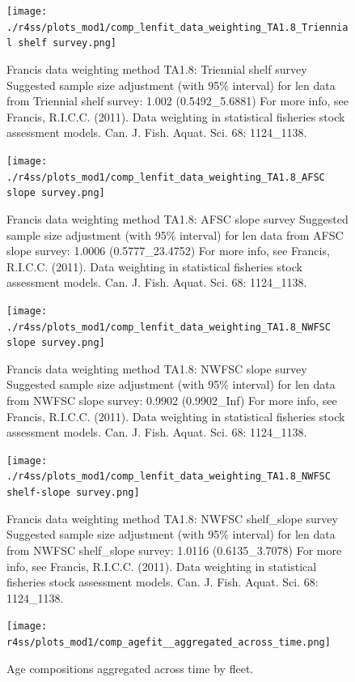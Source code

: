 \documentclass[12pt,]{article}
\begin{document}
\begin{figure}
\centering
\texttt{[image: ./r4ss/plots\_mod1/comp\_lenfit\_data\_weighting\_TA1.8\_Triennial shelf survey.png]}
\caption{Francis data weighting method TA1.8: Triennial shelf survey
Suggested sample size adjustment (with 95\% interval) for len data from
Triennial shelf survey: 1.002 (0.5492\_5.6881) For more info, see
Francis, R.I.C.C. (2011). Data weighting in statistical fisheries stock
assessment models. Can. J. Fish. Aquat. Sci. 68: 1124\_1138.
\label{fig:weighting_len_triennial}}
\end{figure}

\begin{figure}
\centering
\texttt{[image: ./r4ss/plots\_mod1/comp\_lenfit\_data\_weighting\_TA1.8\_AFSC slope survey.png]}
\caption{Francis data weighting method TA1.8: AFSC slope survey
Suggested sample size adjustment (with 95\% interval) for len data from
AFSC slope survey: 1.0006 (0.5777\_23.4752) For more info, see Francis,
R.I.C.C. (2011). Data weighting in statistical fisheries stock
assessment models. Can. J. Fish. Aquat. Sci. 68: 1124\_1138.
\label{fig:weighting_len_afsc}}
\end{figure}

\begin{figure}
\centering
\texttt{[image: ./r4ss/plots\_mod1/comp\_lenfit\_data\_weighting\_TA1.8\_NWFSC slope survey.png]}
\caption{Francis data weighting method TA1.8: NWFSC slope survey
Suggested sample size adjustment (with 95\% interval) for len data from
NWFSC slope survey: 0.9902 (0.9902\_Inf) For more info, see Francis,
R.I.C.C. (2011). Data weighting in statistical fisheries stock
assessment models. Can. J. Fish. Aquat. Sci. 68: 1124\_1138.
\label{fig:weighting_len_nwfsc}}
\end{figure}

\begin{figure}
\centering
\texttt{[image: ./r4ss/plots\_mod1/comp\_lenfit\_data\_weighting\_TA1.8\_NWFSC shelf-slope survey.png]}
\caption{Francis data weighting method TA1.8: NWFSC shelf\_slope survey
Suggested sample size adjustment (with 95\% interval) for len data from
NWFSC shelf\_slope survey: 1.0116 (0.6135\_3.7078) For more info, see
Francis, R.I.C.C. (2011). Data weighting in statistical fisheries stock
assessment models. Can. J. Fish. Aquat. Sci. 68: 1124\_1138.
\label{fig:weighting_len_nwfsccombo}}
\end{figure}

\FloatBarrier

\begin{figure}
\centering
\texttt{[image: r4ss/plots\_mod1/comp\_agefit\_\_aggregated\_across\_time.png]}
\caption{Age compositions aggregated across time by fleet.
\label{fig:age_agg}}
\end{figure}
\end{document}
